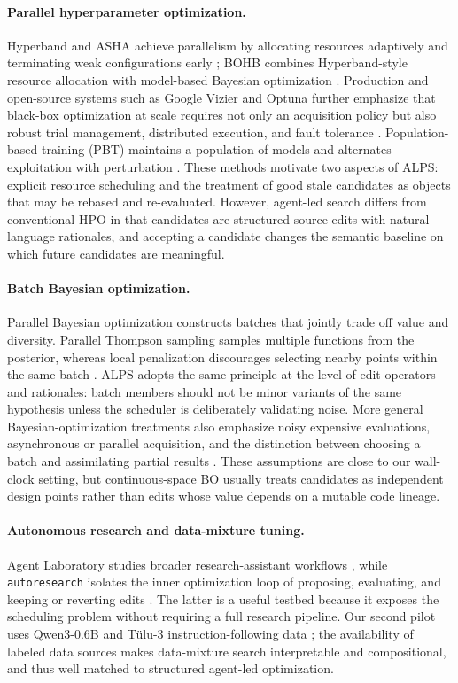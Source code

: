 \documentclass{article}
\newcommand{\alps}{ALPS\xspace}
\begin{document}
\paragraph{Parallel hyperparameter optimization.}
Hyperband and ASHA achieve parallelism by allocating resources adaptively and terminating weak configurations early \citep{hyperband,asha}; BOHB combines Hyperband-style resource allocation with model-based Bayesian optimization \citep{bohb}. Production and open-source systems such as Google Vizier and Optuna further emphasize that black-box optimization at scale requires not only an acquisition policy but also robust trial management, distributed execution, and fault tolerance \citep{vizier,optuna}. Population-based training (PBT) maintains a population of models and alternates exploitation with perturbation \citep{pbt}. These methods motivate two aspects of \alps: explicit resource scheduling and the treatment of good stale candidates as objects that may be rebased and re-evaluated. However, agent-led search differs from conventional HPO in that candidates are structured source edits with natural-language rationales, and accepting a candidate changes the semantic baseline on which future candidates are meaningful.

\paragraph{Batch Bayesian optimization.}
Parallel Bayesian optimization constructs batches that jointly trade off value and diversity. Parallel Thompson sampling samples multiple functions from the posterior, whereas local penalization discourages selecting nearby points within the same batch \citep{thompson_batch_bo,local_penalization}. \alps adopts the same principle at the level of edit operators and rationales: batch members should not be minor variants of the same hypothesis unless the scheduler is deliberately validating noise. More general Bayesian-optimization treatments also emphasize noisy expensive evaluations, asynchronous or parallel acquisition, and the distinction between choosing a batch and assimilating partial results \citep{frazier2018tutorial,parallel_ts,qei}. These assumptions are close to our wall-clock setting, but continuous-space BO usually treats candidates as independent design points rather than edits whose value depends on a mutable code lineage.

\paragraph{Autonomous research and data-mixture tuning.}
Agent Laboratory studies broader research-assistant workflows \citep{agentlab}, while \texttt{autoresearch} isolates the inner optimization loop of proposing, evaluating, and keeping or reverting edits \citep{karpathy_autoresearch}. The latter is a useful testbed because it exposes the scheduling problem without requiring a full research pipeline. Our second pilot uses Qwen3-0.6B \citep{qwen3} and T\"ulu-3 instruction-following data \citep{tulu3}; the availability of labeled data sources makes data-mixture search interpretable and compositional, and thus well matched to structured agent-led optimization.
\end{document}
